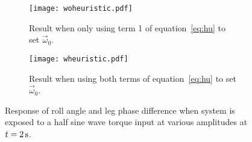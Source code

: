 \begin{figure}[tb]
\centering
\begin{subfigure}[t]{\textwidth}
    \centering
    \texttt{[image: woheuristic.pdf]}
    \caption{Result when only using term 1 of equation~\ref{eq:hu} to set $\vec{\omega}_0$.} 
    \label{fig:woheu}
    \vspace{0.15 in}
\end{subfigure}
\begin{subfigure}[t]{\textwidth}
    \centering
    \texttt{[image: wheuristic.pdf]}
    \caption{Result when using both terms of equation~\ref{eq:hu} to set $\vec{\omega}_0$.} 
    \label{fig:wheu}
\end{subfigure}
\caption{Response of roll angle and leg phase difference when system is exposed to a half sine wave torque input at various amplitudes at $t=\unit[2]{s}$.} 
\label{fig:results}
\end{figure}
